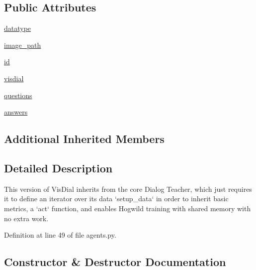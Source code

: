 \subsection*{Public Attributes}
\begin{DoxyCompactItemize}
\item 
\hyperlink{classparlai_1_1tasks_1_1visdial_1_1agents_1_1DefaultTeacher_ab0c8e86570399b0ea8f6c96c49dc1b38}{datatype}
\item 
\hyperlink{classparlai_1_1tasks_1_1visdial_1_1agents_1_1DefaultTeacher_a81c9d1779709d5dbf85b927ac4362496}{image\+\_\+path}
\item 
\hyperlink{classparlai_1_1tasks_1_1visdial_1_1agents_1_1DefaultTeacher_af57a8b4ff4119a00559189e2e1fb4ab9}{id}
\item 
\hyperlink{classparlai_1_1tasks_1_1visdial_1_1agents_1_1DefaultTeacher_a8cb96fb50b9c8d040dcb9bd8dd3d1d3e}{visdial}
\item 
\hyperlink{classparlai_1_1tasks_1_1visdial_1_1agents_1_1DefaultTeacher_a4e9d61cd05584be7a63d7407372ce13a}{questions}
\item 
\hyperlink{classparlai_1_1tasks_1_1visdial_1_1agents_1_1DefaultTeacher_a34ad9bd4ee7fcc11445e1df938f0d209}{answers}
\end{DoxyCompactItemize}
\subsection*{Additional Inherited Members}


\subsection{Detailed Description}
\begin{DoxyVerb}This version of VisDial inherits from the core Dialog Teacher, which just requires
it to define an iterator over its data `setup_data` in order to inherit basic
metrics, a `act` function, and enables Hogwild training with shared memory with no
extra work.
\end{DoxyVerb}
 

Definition at line 49 of file agents.\+py.



\subsection{Constructor \& Destructor Documentation}
\mbox{\label{classparlai_1_1tasks_1_1visdial_1_1agents_1_1DefaultTeacher_ad888b8b7612e78dec919a6769f7e0623}} 
